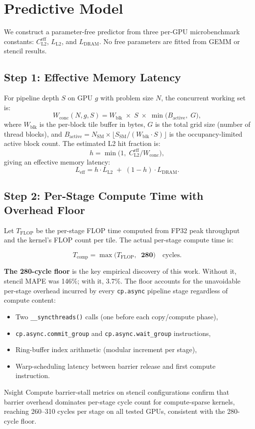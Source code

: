 \documentclass[sigplan,nonacm,10pt]{acmart}
\newcommand{\cpasync}{\texttt{cp.async}}
\begin{document}
\section{Predictive Model}
\label{sec:model}

We construct a parameter-free predictor from three per-GPU microbenchmark
constants: $C_{\text{L2}}^{\text{eff}}$, $L_{\text{L2}}$, and
$L_{\text{DRAM}}$.
No free parameters are fitted from GEMM or stencil results.

\subsection{Step 1: Effective Memory Latency}

For pipeline depth $S$ on GPU $g$ with problem size $N$, the concurrent
working set is:
\[
  W_{\text{conc}}(N,g,S) = W_{\text{blk}} \;\times\; S \;\times\;
  \min\!\bigl(B_{\text{active}},\; G\bigr),
\]
where $W_{\text{blk}}$ is the per-block tile buffer in bytes,
$G$ is the total grid size (number of thread blocks), and
$B_{\text{active}} = N_{\text{SM}} \times
\lfloor S_{\text{SM}} / (W_{\text{blk}} \cdot S) \rfloor$ is the
occupancy-limited active block count.
The estimated L2 hit fraction is:
\[
  h = \min\!\bigl(1,\; C_{\text{L2}}^{\text{eff}} / W_{\text{conc}}\bigr),
\]
giving an effective memory latency:
\[
  L_{\text{eff}} = h \cdot L_{\text{L2}} \;+\; (1-h) \cdot L_{\text{DRAM}}.
\]

\subsection{Step 2: Per-Stage Compute Time with Overhead Floor}

Let $T_{\text{FLOP}}$ be the per-stage FLOP time computed from FP32
peak throughput and the kernel's FLOP count per tile.
The actual per-stage compute time is:

\[
  T_{\text{comp}} = \max\!\bigl(T_{\text{FLOP}},\;\; \mathbf{280}\bigr)
  \quad\text{cycles}.
\]

\textbf{The 280-cycle floor} is the key empirical discovery of this
work.
Without it, stencil MAPE was 146\%; with it, 3.7\%.
The floor accounts for the unavoidable per-stage overhead incurred by
every \cpasync{} pipeline stage regardless of compute content:
\begin{itemize}
  \item Two \texttt{\_\_syncthreads()} calls (one before each
    copy/compute phase),
  \item \texttt{cp.async.commit\_group} and \texttt{cp.async.wait\_group}
    instructions,
  \item Ring-buffer index arithmetic (modular increment per stage),
  \item Warp-scheduling latency between barrier release and first
    compute instruction.
\end{itemize}
Nsight Compute barrier-stall metrics on stencil configurations confirm
that barrier overhead dominates per-stage cycle count for
compute-sparse kernels, reaching 260--310 cycles per stage on all
tested GPUs, consistent with the 280-cycle floor.
\end{document}
